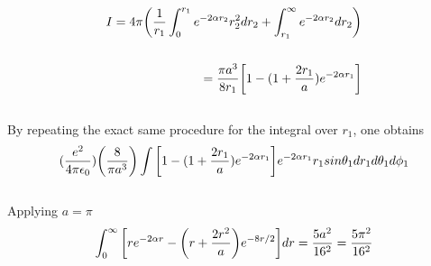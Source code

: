 \documentclass[%
reprint,nofootinbib,
amsmath,amssymb,
aps,
]{revtex4-1}
\begin{document}
\begin{align*}
	I = 4\pi\qty(\dfrac{1}{r_1}\int_{0}^{r_1}e^{-2\alpha r_2}r_2^2dr_2 + \int_{r_1}^{\infty}e^{-2\alpha r_2}dr_2) \\  \\
	= \dfrac{\pi a^3}{8r_1}\qty[1-(1+\dfrac{2r_1}{a})e^{-2\alpha r_1}]
\end{align*}\vspace{2mm}\\ 
By repeating the exact same procedure for the integral over $r_1$, one obtains\vspace{2mm}\\ 
\begin{align*}
	(\dfrac{e^2}{4\pi\epsilon_0})\qty(\dfrac{8}{\pi a^3})\int\qty[1-(1+\dfrac{2r_1}{a})e^{-2\alpha r_1}]e^{-2\alpha r_1}r_1sin\theta_1dr_1d\theta_1d\phi_1
\end{align*}\vspace{2mm}\\ 
Applying $a=\pi$\vspace{2mm}\\ 
\begin{equation*}
	\int_{0}^{\infty}\qty[re^{-2\alpha r}-\qty(r+\dfrac{2r^2}{a})e^{-8r/2}]dr = \dfrac{5a^2}{16^2} = \dfrac{5\pi^2}{16^2}
\end{equation*}
\end{document}
